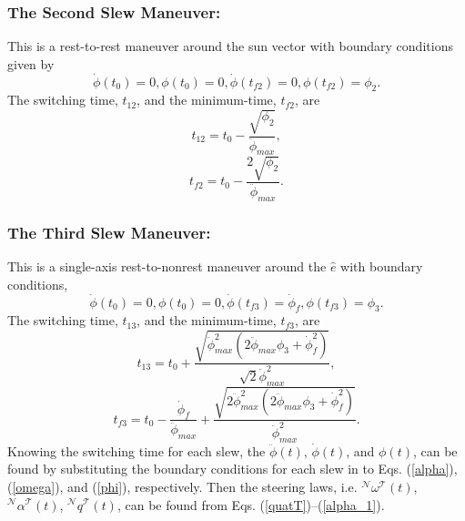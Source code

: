 \documentclass[letterpaper, paper,12pt]{AAS}		%
\begin{document}
	\subsubsection{The Second Slew Maneuver:}
	This is a rest-to-rest maneuver around the sun vector with boundary conditions given by	
	\begin{equation}\label{Bc2}
	\dot{\phi}(t_0)=0, \phi(t_0)=0, \dot{\phi}(t_{f2})=0, \phi(t_{f2})=\phi_2.
	\end{equation}
	The switching time, $t_{12}$, and the minimum-time, $t_{f2}$, are
	\begin{equation}\label{t21}
	t_{12}=t_0-\frac{\sqrt{\phi_2}}{\ddot{\phi}_{max}},
	\end{equation}
	\begin{equation}\label{tf2}
	t_{f2}=t_0-\frac{2\sqrt{\phi_2}}{\ddot{\phi}_{max}}.
	\end{equation}

	
	
	\subsubsection{The Third Slew Maneuver:}
	 This is a  single-axis rest-to-nonrest maneuver around the $\hat{e}$ with boundary conditions,
	\begin{equation}\label{Bc3}
	\dot{\phi}(t_0)=0,\phi(t_0)=0, \dot{\phi}(t_{f3})=\dot{\phi}_{f},\phi(t_{f3})=\phi_3.
	\end{equation}
	The switching time, $t_{13}$, and the minimum-time, $t_{f3}$, are
	\begin{equation}\label{t31}
	t_{13}=t_0+\frac{\sqrt{\ddot{\phi}_{max}^2(2\ddot{\phi}_{max}\phi_3+\dot{\phi}_{f}^2)}}{\sqrt{2}\ddot{\phi}_{max}^2},
	\end{equation}
	\begin{equation}\label{tf3}
	t_{f3}=t_0-\frac{\dot{\phi}_{f}}{\ddot{\phi}_{max}}+\frac{\sqrt{2\ddot{\phi}_{max}^2(2\ddot{\phi}_{max}\phi_3+\dot{\phi}_{f}^2)}}{\ddot{\phi}_{max}^2}.
	\end{equation}
	Knowing the switching time for each slew, the $\ddot{\phi}(t)$, $\dot{\phi}(t)$, and  $\phi(t)$, can be found by substituting the boundary conditions for each slew in to Eqs. (\ref{alpha}), (\ref{omega}), and (\ref{phi}), respectively. Then the steering laws, i.e. $^\mathcal{N}\omega^\mathcal{T}(t)$, $^\mathcal{N}\alpha^\mathcal{T}(t)$, $^\mathcal{N}q^\mathcal{T}(t)$, can be found from Eqs. (\ref{quatT})--(\ref{alpha_1}).	
\end{document}
